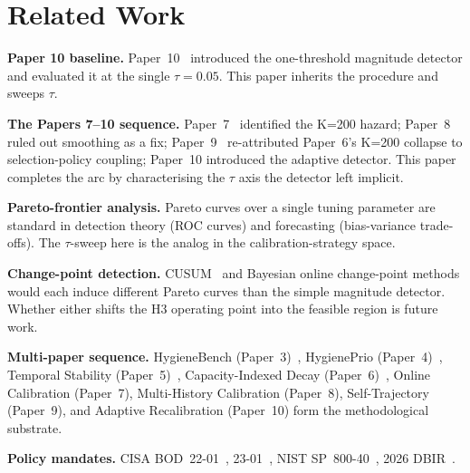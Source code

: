 \section{Related Work}

\textbf{Paper 10 baseline.} Paper~10~\cite{paper10adaptive} introduced
the one-threshold magnitude detector and evaluated it at the single
$\tau = 0.05$. This paper inherits the procedure and sweeps $\tau$.

\textbf{The Papers 7--10 sequence.}
Paper~7~\cite{paper7online} identified the K=200 hazard;
Paper~8~\cite{paper8multi} ruled out smoothing as a fix;
Paper~9~\cite{paper9selftraj} re-attributed Paper~6's K=200 collapse
to selection-policy coupling;
Paper~10 introduced the adaptive detector. This paper completes the
arc by characterising the $\tau$ axis the detector left implicit.

\textbf{Pareto-frontier analysis.} Pareto curves over a single tuning
parameter are standard in detection theory (ROC curves) and
forecasting (bias-variance trade-offs). The $\tau$-sweep here is the
analog in the calibration-strategy space.

\textbf{Change-point detection.} CUSUM~\cite{page1954cusum} and
Bayesian online change-point methods would each induce different
Pareto curves than the simple magnitude detector. Whether either
shifts the H3 operating point into the feasible region is future
work.

\textbf{Multi-paper sequence.} HygieneBench (Paper~3)~\cite{paper3hygienebench},
HygienePrio (Paper~4)~\cite{paper4hygieneprio}, Temporal Stability
(Paper~5)~\cite{paper5temporal}, Capacity-Indexed Decay
(Paper~6)~\cite{paper6capacity}, Online Calibration (Paper~7),
Multi-History Calibration (Paper~8), Self-Trajectory
(Paper~9), and Adaptive Recalibration (Paper~10) form the
methodological substrate.

\textbf{Policy mandates.} CISA BOD~22-01~\cite{cisa2021bod2201},
23-01~\cite{cisa2022bod2301}, NIST SP~800-40~\cite{nist2022sp80040r4},
2026 DBIR~\cite{verizon2026dbir}.
